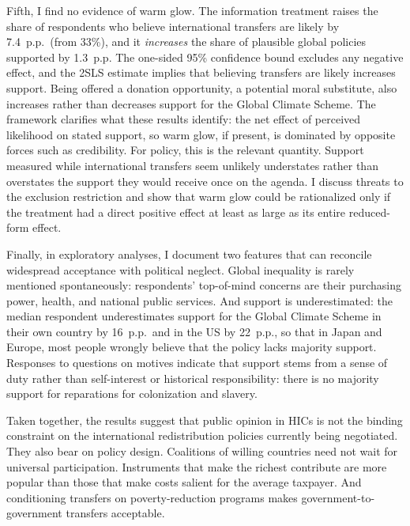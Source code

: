 \documentclass[12pt,english]{article}
\begin{document}
Fifth, I find no evidence of warm glow. The information treatment raises the share of respondents who believe international transfers are likely by 7.4~p.p.\ (from 33\%), and it \textit{increases} the share of plausible global policies supported by 1.3~p.p. The one-sided 95\% confidence bound excludes any negative effect, and the 2SLS estimate implies that believing transfers are likely increases support. Being offered a donation opportunity, a potential moral substitute, also increases rather than decreases support for the Global Climate Scheme. The framework clarifies what these results identify: the net effect of perceived likelihood on stated support, so warm glow, if present, is dominated by opposite forces such as credibility. For policy, this is the relevant quantity. Support measured while international transfers seem unlikely understates rather than overstates the support they would receive once on the agenda. I discuss threats to the exclusion restriction and show that warm glow could be rationalized only if the treatment had a direct positive effect at least as large as its entire reduced-form effect.

Finally, in exploratory analyses, I document two features that can reconcile widespread acceptance with political neglect. Global inequality is rarely mentioned spontaneously: respondents' top-of-mind concerns are their purchasing power, health, and national public services. And support is underestimated: the median respondent underestimates support for the Global Climate Scheme in their own country by 16~p.p.\ and in the US by 22~p.p., so that in Japan and Europe, most people wrongly believe that the policy lacks majority support. Responses to questions on motives indicate that support stems from a sense of duty rather than self-interest or historical responsibility: there is no majority support for reparations for colonization and slavery.

Taken together, the results suggest that public opinion in HICs is not the binding constraint on the international redistribution policies currently being negotiated. They also bear on policy design. Coalitions of willing countries need not wait for universal participation. Instruments that make the richest contribute are more popular than those that make costs salient for the average taxpayer. And conditioning transfers on poverty-reduction programs makes government-to-government transfers acceptable.
\end{document}
